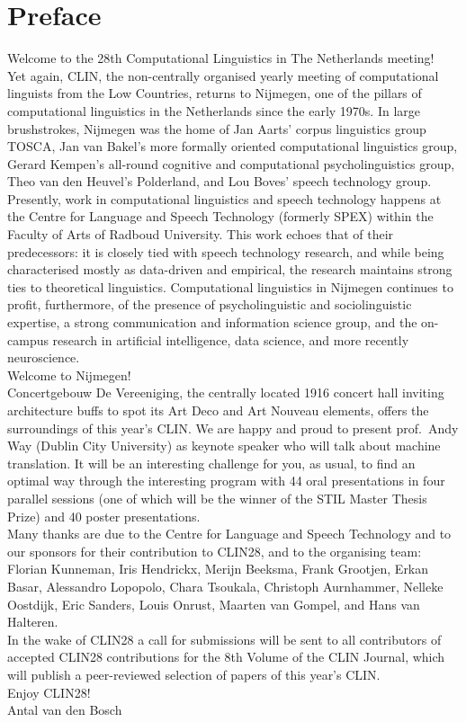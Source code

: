 \section*{Preface}



Welcome to the 28th Computational Linguistics in The Netherlands meeting!\\[1em]

Yet again, CLIN, the non-centrally organised yearly meeting of computational linguists from the Low Countries, returns to Nijmegen, one of the pillars of computational linguistics in the Netherlands since the early 1970s. In large brushstrokes, Nijmegen was the home of Jan Aarts’ corpus linguistics group TOSCA, Jan van Bakel’s more formally oriented computational linguistics group, Gerard Kempen’s all-round cognitive and computational psycholinguistics group, Theo van den Heuvel’s Polderland, and Lou Boves’ speech technology group. Presently, work in computational linguistics and speech technology happens at the Centre for Language and Speech Technology (formerly SPEX) within the Faculty of Arts of Radboud University. This work echoes that of their predecessors: it is closely tied with speech technology research, and while being characterised mostly as data-driven and empirical, the research maintains strong ties to theoretical linguistics. Computational linguistics in Nijmegen continues to profit, furthermore, of the presence of  psycholinguistic and sociolinguistic expertise, a strong communication and information science group, and the on-campus research in artificial intelligence, data science, and more recently neuroscience.\\[1em]

Welcome to Nijmegen!\\[1em]

Concertgebouw De Vereeniging, the centrally located 1916 concert hall inviting architecture buffs to spot its Art Deco and Art Nouveau elements, offers the surroundings of this year’s CLIN. We are happy and proud to present prof.~Andy Way (Dublin City University) as keynote speaker who will talk about machine translation. It will be an interesting challenge for you, as usual, to find an optimal way through the interesting program with 44 oral presentations in four parallel sessions (one of which will be the winner of the STIL Master Thesis Prize) and 40 poster presentations.\\[1em]

Many thanks are due to the Centre for Language and Speech Technology and to our sponsors for their contribution to CLIN28, and to the organising team: Florian Kunneman, Iris Hendrickx, Merijn Beeksma, Frank Grootjen, Erkan Basar, Alessandro Lopopolo, Chara Tsoukala, Christoph Aurnhammer, Nelleke Oostdijk, Eric Sanders, Louis Onrust, Maarten van Gompel, and Hans van Halteren.\\[1em]

In the wake of CLIN28 a call for submissions will be sent to all contributors of accepted CLIN28 contributions for the 8th Volume of the CLIN Journal, which will publish a peer-reviewed selection of papers of this year’s CLIN. \\[1em]

Enjoy CLIN28!\\[1em]

Antal van den Bosch


